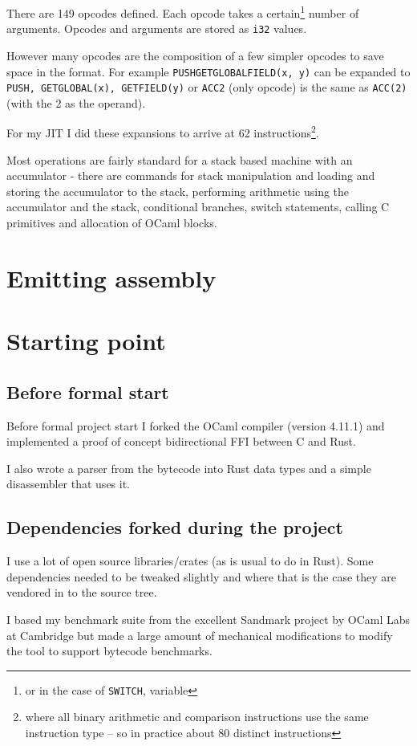 There are 149 opcodes defined. Each opcode takes a certain\footnote{or in the case of
    \texttt{SWITCH}, variable} number of arguments. Opcodes and arguments are stored as
\texttt{i32}
values.

However many opcodes are the composition of a few simpler opcodes to save space in the
format. For example \texttt{PUSHGETGLOBALFIELD(x, y)} can be expanded to \texttt{PUSH,
    GETGLOBAL(x), GETFIELD(y)} or \texttt{ACC2} (only opcode) is the same as \texttt{ACC(2)} (with
the 2 as the operand).

For my JIT I did these expansions to arrive at 62 instructions\footnote{where all binary
    arithmetic and comparison instructions use the same instruction type -- so in practice about
    80 distinct instructions}.

Most operations are fairly standard for a stack based machine with an accumulator - there are
commands for stack manipulation and loading and storing the accumulator to the stack, performing
arithmetic using the accumulator and the stack,
conditional branches, switch statements, calling C primitives and allocation of OCaml blocks.

\section{Emitting assembly}

\section{Starting point}

\subsection{Before formal start}

Before formal project start I forked the OCaml compiler (version 4.11.1) and implemented a proof
of concept bidirectional FFI between C and Rust.

I also wrote a parser from the bytecode into Rust data types and a simple disassembler that uses
it.

\subsection{Dependencies forked during the project}

I use a lot of open source libraries/crates (as is usual to do in Rust). Some dependencies needed
to be
tweaked slightly and where that is the case they are vendored in to the source tree.

I based my benchmark suite from the excellent Sandmark project by OCaml Labs at Cambridge but
made a large amount of mechanical modifications to modify the tool to support bytecode
benchmarks.
